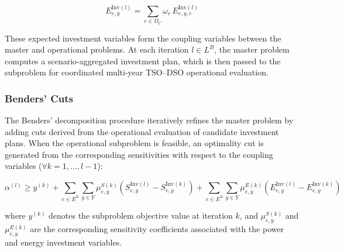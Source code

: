 \documentclass[preprint,12pt]{elsarticle}
\begin{document}
\begin{equation}
    E^{\text{Inv}(l)}_{e,y} = \sum_{c \in \Omega_C} \omega_c \, E^{\text{Inv}(l)}_{e,y,c}
\end{equation}

These expected investment variables form the coupling variables between the master and operational problems. At each iteration $l \in L^B$, the master problem computes a scenario-aggregated investment plan, which is then passed to the subproblem for coordinated multi-year TSO--DSO operational evaluation.


\subsubsection{Benders' Cuts}

The Benders' decomposition procedure iteratively refines the master problem by adding cuts derived from the operational evaluation of candidate investment plans. When the operational subproblem is feasible, an optimality cut is generated from the corresponding sensitivities with respect to the coupling variables ($\forall k = 1, \ldots, l-1$):

\begin{equation}
    \alpha^{(l)} \ge y^{(k)} 
    +
    \sum_{e \in E^S}\sum_{y \in Y}
    \mu^{S(k)}_{e,y}\left(S^{\text{Inv}(l)}_{e,y}-S^{\text{Inv}(k)}_{e,y}\right)
    +
    \sum_{e \in E^S}\sum_{y \in Y}
    \mu^{E(k)}_{e,y}\left(E^{\text{Inv}(l)}_{e,y}-E^{\text{Inv}(k)}_{e,y}\right)
\end{equation}

\noindent
where 
$y^{(k)}$ denotes the subproblem objective value at iteration $k$, and 
$\mu^{S(k)}_{e,y}$ and $\mu^{E(k)}_{e,y}$ are the corresponding sensitivity coefficients associated with the power and energy investment variables.
\end{document}
